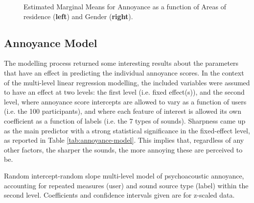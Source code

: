    \begin{figure}
     \label{fig:anova}
     \centering
     \caption{Estimated Marginal Means for Annoyance as a function of Areas of residence (\textbf{left}) and Gender (\textbf{right}).}
   \end{figure}

 \subsection{Annoyance Model}
   The modelling process returned some interesting results about the parameters that have an effect in predicting the individual annoyance scores. In the context of the multi-level linear regression modelling, the included variables were assumed to have an effect at two levels: the first level (i.e. fixed effect(s)), and the second level, where annoyance score intercepts are allowed to vary as a function of users (i.e. the 100 participants), and where each feature of interest is allowed its own coefficient as a function of labels (i.e. the 7 types of sounds). Sharpness came up as the main predictor with a strong statistical significance in the fixed-effect level, as reported in Table \ref{tab:annoyance-model}. This implies that, regardless of any other factors, the sharper the sounds, the more annoying these are perceived to be.

   \begin{table}
     \label{tab:annoyance-model}
     \centering
     \caption{Random intercept-random slope multi-level model of psychoacoustic annoyance, accounting for repeated measures (user) and sound source type (label) within the second level. Coefficients and confidence intervals given are for z-scaled data.}
   \end{table}


